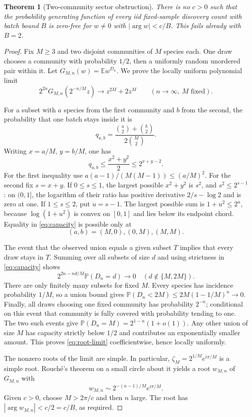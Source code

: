 \documentclass[11pt]{article}
\numberwithin{equation}{section}
\newtheorem{theorem}{Theorem}[section]
\theoremstyle{remark}\newtheorem{remark}[theorem]{Remark}
\newcommand{\E}{\mathbb E}\newcommand{\Pp}{\mathbb P}
\begin{document}
\begin{theorem}[Two-community sector obstruction]\label{thm:sector}
There is no $c>0$ such that the probability generating function of every
iid fixed-sample discovery count with batch bound $B$ is zero-free for
$w\ne0$ with $|\arg w|<c/B$. This fails already with $B=2$.
\end{theorem}
\begin{proof}
Fix $M\ge3$ and two disjoint communities of $M$ species each. One draw
chooses a community with probability $1/2$, then a uniformly random
unordered pair within it. Let $G_{M,n}(w)=\E w^{D_n}$. We prove the
locally uniform polynomial limit
\begin{equation}\label{eq:root-limit}
 2^{2n}G_{M,n}(2^{-n/M}z)\longrightarrow z^{2M}+2z^M
 \qquad(n\to\infty,\ M\text{ fixed}).
\end{equation}

For a subset with $a$ species from the first community and $b$ from the
second, the probability that one batch stays inside it is
\[
 q_{a,b}=\frac{\binom a2+\binom b2}{2\binom M2}.
\]
Writing $x=a/M$, $y=b/M$, one has
\begin{equation}\label{eq:capacity}
 q_{a,b}\le\frac{x^2+y^2}{2}\le2^{x+y-2}.
\end{equation}
For the first inequality use
$a(a-1)/(M(M-1))\le(a/M)^2$. For the second fix $s=x+y$.
If $0\le s\le1$, the largest possible $x^2+y^2$ is $s^2$, and
$s^2\le2^{s-1}$: on $(0,1]$, the logarithm of their ratio has positive
derivative $2/s-\log2$ and is zero at one. If $1\le s\le2$, put
$u=s-1$. The largest possible sum is $1+u^2\le2^u$, because
$\log(1+u^2)$ is convex on $[0,1]$ and lies below its endpoint chord.
Equality in \eqref{eq:capacity} is possible only at
\[
 (a,b)=(M,0),(0,M),(M,M).
\]

The event that the observed union equals a given subset $T$ implies
that every draw stays in $T$. Summing over all subsets of size $d$ and
using strictness in \eqref{eq:capacity} shows
\[
 2^{2n-nd/M}\Pp(D_n=d)\longrightarrow0
 \quad(d\notin\{M,2M\}).
\]
There are only finitely many subsets for fixed $M$. Every species has
incidence probability $1/M$, so a union bound gives
$\Pp(D_n<2M)\le2M(1-1/M)^n\to0$. Finally, all draws choosing one fixed
community has probability $2^{-n}$; conditional on this event that
community is fully covered with probability tending to one. The two
such events give $\Pp(D_n=M)=2^{1-n}(1+o(1))$. Any other union of size
$M$ has capacity strictly below $1/2$ and contributes an exponentially
smaller amount. This proves \eqref{eq:root-limit} coefficientwise,
hence locally uniformly.

The nonzero roots of the limit are simple. In particular,
$\zeta_M=2^{1/M}e^{i\pi/M}$ is a simple root. Rouch\'e's theorem on a
small circle about it yields a root $w_{M,n}$ of $G_{M,n}$ with
\begin{equation}\label{eq:smallangle}
 w_{M,n}\sim2^{-(n-1)/M}e^{i\pi/M}.
\end{equation}
Given $c>0$, choose $M>2\pi/c$ and then $n$ large. The root has
$|\arg w_{M,n}|<c/2=c/B$, as required.
\end{proof}
\end{document}
